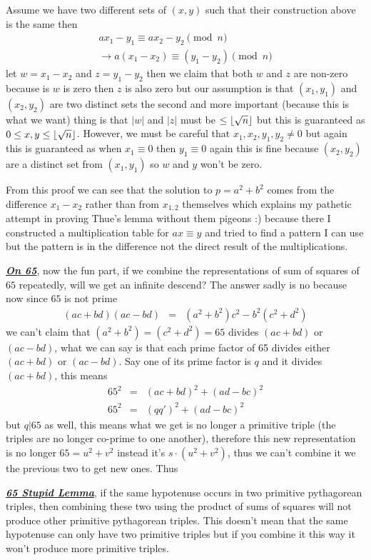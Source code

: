 \documentclass[aps,preprint,preprintnumbers,nofootinbib,showpacs,prd]{revtex4-1}
\newcommand{\nbea}{\begin{eqnarray*}}
\newcommand{\neea}{\end{eqnarray*}}
\DeclarePairedDelimiter{\floor}{\lfloor}{\rfloor}
\begin{document}
Assume we have two different sets of $(x,y)$ such that their construction above is the same then
%
\nbea
ax_1 - y_1 \equiv ax_2 - y_2 \pmod{n} \\
\to a(x_1 - x_2) \equiv (y_1 - y_2) \pmod{n}
\neea
%
let $w = x_1 - x_2$ and $z = y_1 - y_2$ then we claim that both $w$ and $z$ are non-zero because is $w$ is zero then $z$ is also zero but our assumption is that $(x_1,y_1)$ and $(x_2,y_2)$ are two distinct sets the second and more important (because this is what we want) thing is that $|w|$ and $|z|$ must be $\le \floor{\sqrt{n}}$ but this is guaranteed as $0 \le x,y \le \floor{\sqrt{n}}$. However, we must be careful that $x_1,x_2,y_1,y_2 \neq 0$ but again this is guaranteed as when $x_1 \equiv 0$ then $y_1 \equiv 0$ again this is fine because $(x_2,y_2)$ are a distinct set from $(x_1,y_1)$ so $w$ and $y$ won't be zero.

From this proof we can see that the solution to $p = a^2 + b^2$ comes from the difference $x_1-x_2$ rather than from $x_{1,2}$ themselves which explains my pathetic attempt in proving Thue's lemma without them pigeons :) because there I constructed a multiplication table for $ax \equiv y$ and tried to find a pattern I can use but the pattern is in the difference not the direct result of the multiplications.

\underline{\textit{\textbf{On 65}}}, now the fun part, if we combine the representations of sum of squares of $65$ repeatedly, will we get an infinite descend? The answer sadly is no because now since $65$ is not prime
%
\nbea
(ac + bd)(ac - bd) & = & (a^2 + b^2)c^2 - b^2(c^2 + d^2)
\neea
%
we can't claim that $(a^2 + b^2) = (c^2 + d^2) = 65$ divides $(ac + bd)$ or $(ac - bd)$, what we can say is that each prime factor of 65 divides either $(ac + bd)$ or $(ac - bd)$. Say one of its prime factor is $q$ and it divides $(ac + bd)$, this means
%
\nbea
65^2 & = & (ac + bd)^2 + (ad - bc)^2 \\
65^2 & = & (qq')^2 + (ad - bc)^2
\neea
%
but $q|65$ as well, this means what we get is no longer a primitive triple (the triples are no longer co-prime to one another), therefore this new representation is no longer $65 = u^2 + v^2$ instead it's $s\cdot(u^2 + v^2)$, thus we can't combine it we the previous two to get new ones. Thus

\underline{\textit{\textbf{65 Stupid Lemma}}}, if the same hypotenuse occurs in two primitive pythagorean triples, then combining these two using the product of sums of squares will not produce other primitive pythagorean triples. This doesn't mean that the same hypotenuse can only have two primitive triples but if you combine it this way it won't produce more primitive triples.
\end{document}
